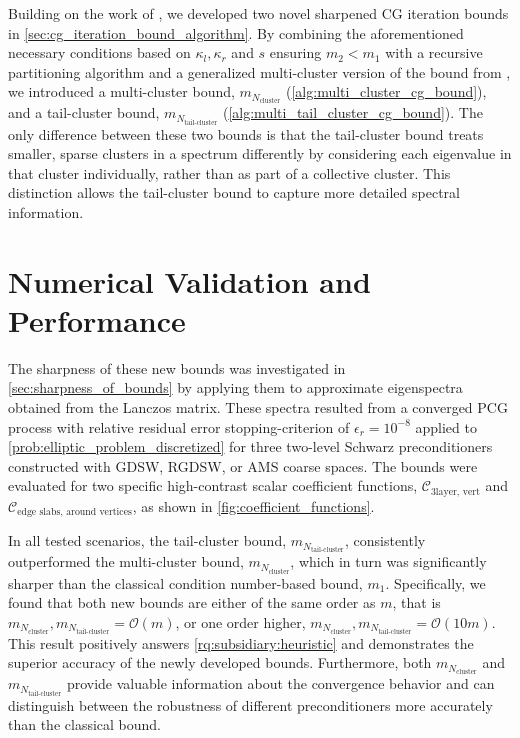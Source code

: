 Building on the work of \citeauthor{cg_sharpened_convrate_Axelsson1976}, we developed two novel sharpened CG iteration bounds in \cref{sec:cg_iteration_bound_algorithm}. By combining the aforementioned necessary conditions based on $\kappa_l,\kappa_r$ and $s$ ensuring $m_2 < m_1$ with a recursive partitioning algorithm and a generalized multi-cluster version of the bound from \cite{cg_sharpened_convrate_Axelsson1976}, we introduced a multi-cluster bound, $m_{N_{\text{cluster}}}$ (\cref{alg:multi_cluster_cg_bound}), and a tail-cluster bound, $m_{N_{\text{tail-cluster}}}$ (\cref{alg:multi_tail_cluster_cg_bound}). The only difference between these two bounds is that the tail-cluster bound treats smaller, sparse clusters in a spectrum differently by considering each eigenvalue in that cluster individually, rather than as part of a collective cluster. This distinction allows the tail-cluster bound to capture more detailed spectral information.

\section{Numerical Validation and Performance}
The sharpness of these new bounds was investigated in \cref{sec:sharpness_of_bounds} by applying them to approximate eigenspectra obtained from the Lanczos matrix. These spectra resulted from a converged PCG process with relative residual error stopping-criterion of $\epsilon_r=10^{-8}$ applied to \cref{prob:elliptic_problem_discretized} for three two-level Schwarz preconditioners constructed with GDSW, RGDSW, or AMS coarse spaces. The bounds were evaluated for two specific high-contrast scalar coefficient functions, $\mathcal{C}_{\text{3layer, vert}}$ and $\mathcal{C}_{\text{edge slabs, around vertices}}$, as shown in \cref{fig:coefficient_functions}.

In all tested scenarios, the tail-cluster bound, $m_{N_{\text{tail-cluster}}}$, consistently outperformed the multi-cluster bound, $m_{N_{\text{cluster}}}$, which in turn was significantly sharper than the classical condition number-based bound, $m_1$. Specifically, we found that both new bounds are either of the same order as $m$, that is $m_{N_{\text{cluster}}}, m_{N_{\text{tail-cluster}}} = \mathcal{O}(m)$, or one order higher, $m_{N_{\text{cluster}}}, m_{N_{\text{tail-cluster}}} = \mathcal{O}(10m)$. This result positively answers \ref{rq:subsidiary:heuristic} and demonstrates the superior accuracy of the newly developed bounds. Furthermore, both $m_{N_{\text{cluster}}}$ and $m_{N_{\text{tail-cluster}}}$ provide valuable information about the convergence behavior and can distinguish between the robustness of different preconditioners more accurately than the classical bound.

